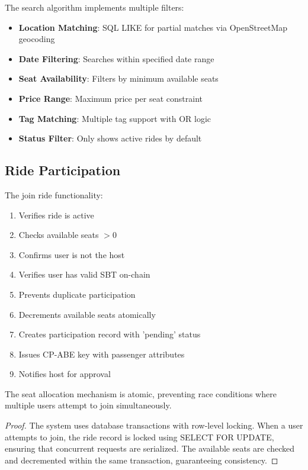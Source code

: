 The search algorithm implements multiple filters:

\begin{itemize}
    \item \textbf{Location Matching}: SQL LIKE for partial matches via OpenStreetMap geocoding
    \item \textbf{Date Filtering}: Searches within specified date range
    \item \textbf{Seat Availability}: Filters by minimum available seats
    \item \textbf{Price Range}: Maximum price per seat constraint
    \item \textbf{Tag Matching}: Multiple tag support with OR logic
    \item \textbf{Status Filter}: Only shows active rides by default
\end{itemize}

\subsection{Ride Participation}

The join ride functionality:

\begin{enumerate}
    \item Verifies ride is active
    \item Checks available seats $> 0$
    \item Confirms user is not the host
    \item Verifies user has valid SBT on-chain
    \item Prevents duplicate participation
    \item Decrements available seats atomically
    \item Creates participation record with 'pending' status
    \item Issues CP-ABE key with passenger attributes
    \item Notifies host for approval
\end{enumerate}

\begin{theorem}
The seat allocation mechanism is atomic, preventing race conditions where multiple users attempt to join simultaneously.
\end{theorem}

\begin{proof}
The system uses database transactions with row-level locking. When a user attempts to join, the ride record is locked using SELECT FOR UPDATE, ensuring that concurrent requests are serialized. The available seats are checked and decremented within the same transaction, guaranteeing consistency.
\end{proof}


